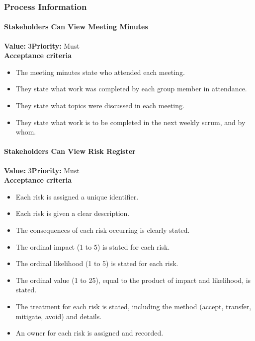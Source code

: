 \subsubsection{Process Information}

\paragraph{Stakeholders Can View Meeting Minutes}
\textbf{Value:} 3\quad \textbf{Priority:} Must\\
\textbf{Acceptance criteria}
\begin{itemize}
  \item The meeting minutes state who attended each meeting.
  \item They state what work was completed by each group member in attendance.
  \item They state what topics were discussed in each meeting.
  \item They state what work is to be completed in the next weekly scrum, and by whom.
\end{itemize}

\paragraph{Stakeholders Can View Risk Register}
\textbf{Value:} 3\quad \textbf{Priority:} Must\\
\textbf{Acceptance criteria}
\begin{itemize}
  \item Each risk is assigned a unique identifier.
  \item Each risk is given a clear description.
  \item The consequences of each risk occurring is clearly stated.
  \item The ordinal impact (1 to 5) is stated for each risk.
  \item The ordinal likelihood (1 to 5) is stated for each risk.
  \item The ordinal value (1 to 25), equal to the product of impact and likelihood, is stated.
  \item The treatment for each risk is stated, including the method (accept, transfer, mitigate, avoid) and details.
  \item An owner for each risk is assigned and recorded.
\end{itemize}

